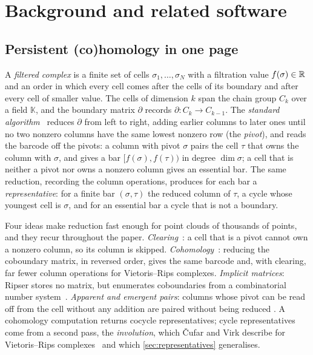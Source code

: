 \section{Background and related software}\label{sec:background}

\subsection{Persistent (co)homology in one page}\label{sec:ph}

A \emph{filtered complex} is a finite set of cells $\sigma_1,\dots,\sigma_N$ with a filtration value $f(\sigma)\in\mathbb{R}$ and an
order in which every cell comes after the cells of its boundary and after every cell of smaller value. The cells of
dimension $k$ span the chain group $C_k$ over a field $\mathbb{K}$, and the boundary matrix $\partial$ records
$\partial\colon C_k\to C_{k-1}$. The \emph{standard algorithm}~\cite{elz2002,zomorodian2005computing} reduces $\partial$ from
left to right, adding earlier columns to later ones until no two nonzero columns have the same lowest nonzero row (the
\emph{pivot}), and reads the barcode off the pivots: a column with pivot $\sigma$ pairs the cell $\tau$ that owns the column
with $\sigma$, and gives a bar $[f(\sigma),f(\tau))$ in degree $\dim\sigma$; a cell that is neither a pivot nor owns a
nonzero column gives an essential bar. The same reduction, recording the column operations, produces for each bar a
\emph{representative}: for a finite bar $(\sigma,\tau)$ the reduced column of $\tau$, a cycle whose youngest cell is $\sigma$,
and for an essential bar a cycle that is not a boundary.

Four ideas make reduction fast enough for point clouds of thousands of points, and they recur throughout the paper.
\emph{Clearing}~\cite{chen2011twist,bkr2014chunks}: a cell that is a pivot cannot own a nonzero column, so its column is
skipped. \emph{Cohomology}~\cite{desilva2011dualities}: reducing the coboundary matrix, in reversed order, gives the same
barcode and, with clearing, far fewer column operations for Vietoris--Rips complexes. \emph{Implicit matrices}: Ripser stores no
matrix, but enumerates coboundaries from a combinatorial number system~\cite{bauer2021ripser}. \emph{Apparent and emergent
pairs}: columns whose pivot can be read off from the cell without any addition are paired without being reduced
\cite{bauer2021ripser}. A cohomology computation returns cocycle representatives; cycle representatives come from
a second pass, the \emph{involution}, which \v{C}ufar and Virk describe for Vietoris--Rips complexes~\cite{cufar2021involuted}
and which \cref{sec:representatives} generalises.

